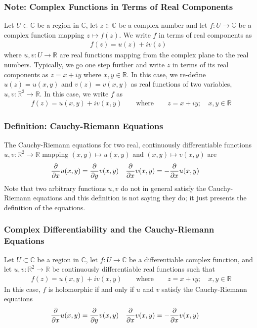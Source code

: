 \documentclass[11pt, a4paper]{article}
\newcommand{\R}{\mathbb{R}} %
\newcommand{\C}{\mathbb{C}} %
\begin{document}
\subsubsection{Note: Complex Functions in Terms of Real Components}
Let $ U \subset \C $ be a region in $ \C $, let $ z \in \C $ be a complex number and let $ f: U \to \C $ be a complex function mapping $ z \mapsto f(z) $. We write $ f $ in terms of real components as
\begin{align*}
	f(z) = u(z) + i v(z)
\end{align*}
where $ u, v : U \to \R $ are real functions mapping from the complex plane to the real numbers. Typically, we go one step further and write $ z $ in terms of its real components as $ z = x + i y $ where $ x, y \in \R $. In this case, we re-define $ u(z) = u(x, y) $ and $ v(z) = v(x, y) $ as real functions of two variables, $ u, v: \R^2 \to \R $. In this case, we write $ f $ as
\begin{align*}
	&f(z) = u(x, y) + iv(x, y) \qquad \text{where} \qquad z = x + iy; \quad x, y \in \R
\end{align*}

\subsubsection{Definition: Cauchy-Riemann Equations}
The Cauchy-Riemann equations for two real, continuously differentiable functions $ u, v: \R^2 \to \R $ mapping $ (x, y) \mapsto u(x, y) $ and $ (x, y) \mapsto v(x, y) $ are
\begin{align*}
	&\pdv{}{x} u(x, y) = \pdv{}{y} v(x, y) && \pdv{}{x} v(x, y) = -\pdv{}{x}u(x, y)
\end{align*}
Note that two arbitrary functions $ u, v $ do not in general satisfy the Cauchy-Riemann equations and this definition is not saying they do; it just presents the definition of the equations. 

\subsubsection{Complex Differentiability and the Cauchy-Riemann Equations}
Let $ U \subset \C $ be a region in $ \C $, let $ f: U \to \C $ be a differentiable complex function, and let $ u, v: \R^2 \to \R $ be continuously differentiable real functions such that
\begin{align*}
	&f(z) = u(x, y) + iv(x, y) \qquad \text{where} \qquad z = x + iy; \quad x, y \in \R
\end{align*}
In this case, $ f $ is holomorphic if and only if $ u $ and $ v $ satisfy the Cauchy-Riemann equations
\begin{align*}
	&\pdv{}{x} u(x, y) = \pdv{}{y} v(x, y) && \pdv{}{x} v(x, y) = -\pdv{}{x}v(x, y)
\end{align*}
\end{document}
